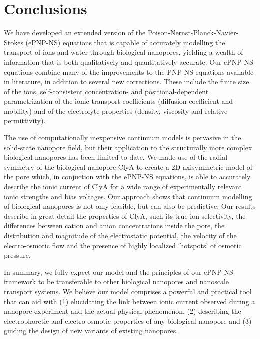 \documentclass[twoside,twocolumn,9pt]{article}
\begin{document}
\section{Conclusions}\label{sec:conclusions}

We have developed an extended version of the Poison-Nernst-Planck-Navier-Stokes (ePNP-NS) equations that is
capable of accurately modelling the transport of ions and water through biological nanopores, yielding a
wealth of information that is both qualitatively and quantitatively accurate. Our ePNP-NS equations combine
many of the improvements to the PNP-NS equations available in literature, in addition to several new
corrections. These include the finite size of the ions, self-consistent concentration- and
positional-dependent parametrization of the ionic transport coefficients (diffusion coefficient and mobility)
and of the electrolyte properties (density, viscosity and relative permittivity).

The use of computationally inexpensive continuum models is pervasive in the solid-state nanopore field, but
their application to the structurally more complex biological nanopores has been limited to date. We made use
of the radial symmetry of the biological nanopore ClyA to create a 2D-axisymmetric model of the pore which, in
conjuction with the ePNP-NS equations, is able to accurately describe the ionic current of ClyA for a wide
range of experimentally relevant ionic strengths and bias voltages. Our approach shows that continuum
modelling of biological nanopores is not only feasible, but can also be predictive. Our results describe in
great detail the properties of ClyA, such its true ion selectivity, the differences between cation and anion
concentrations inside the pore, the distribution and magnitude of the electrostatic potential, the velocity of
the electro-osmotic flow and the presence of highly localized `hotspots' of osmotic pressure. 

In summary, we fully expect our model and the principles of our ePNP-NS framework to be transferable to other
biological nanopores and nanoscale transport systems. We believe our model comprises a powerful and practical
tool that can aid with (1) elucidating the link between ionic current observed during a nanopore experiment
and the actual physical phenomenon, (2) describing the electrophoretic and electro-osmotic properties of any
biological nanopore and (3) guiding the design of new variants of existing nanopores. 

\end{document}
